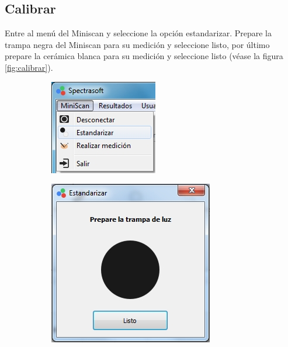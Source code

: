 	\subsection*{Calibrar}
		Entre al men\'{u} del Miniscan y seleccione la opci\'{o}n estandarizar. Prepare la trampa negra del Miniscan para su medici\'{o}n y seleccione listo, por \'{u}ltimo prepare la cer\'{a}mica blanca para su medici\'{o}n y seleccione listo (v\'{e}ase la figura \ref{fig:calibrar}).
\vfill
\begin{figure}[H]
\centering
\begin{subfigure}{.33\textwidth}
  \centering
  \includegraphics[width=.9\linewidth]{./img/estandarizar.jpg}
\end{subfigure}%
\centering
\begin{subfigure}{.33\textwidth}
  \centering
  \includegraphics[width=.9\linewidth]{./img/estandarizar-negro.jpg}

\end{subfigure}
\end{figure}
